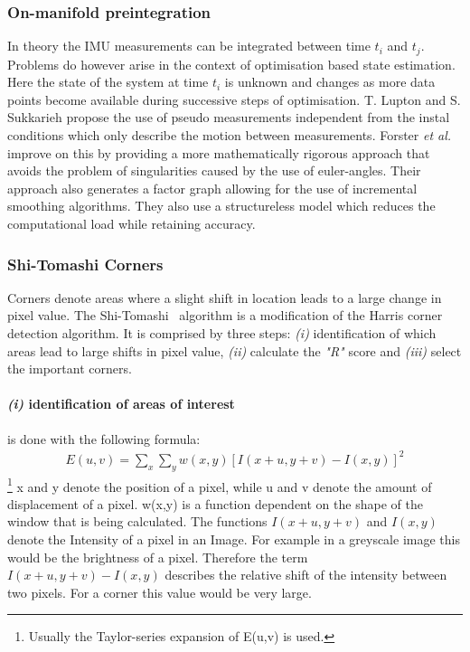 \documentclass[11pt,a4paper]{article}
\begin{document}
\subsubsection{On-manifold preintegration} \label{pre:on-manifold}
In theory the IMU measurements can be integrated between time $t_i$ and $t_j$.
Problems do however arise in the context of optimisation based state estimation. 
Here the state of the system at time $t_i$ is unknown and changes as more data points become available during successive steps of optimisation.
T. Lupton and S. Sukkarieh \cite{preint_lupton} propose the use of pseudo measurements independent from the instal conditions which only describe the motion between measurements.
Forster \textit{et al.} \cite{Forster_2017} improve on this by providing a more mathematically rigorous approach that avoids the problem of singularities caused by the use of euler-angles. 
Their approach also generates a factor graph allowing for the use of incremental smoothing algorithms. 
They also use a structureless model which reduces the computational load while retaining accuracy.

\subsubsection{Shi-Tomashi Corners} \label{Sec:Shi-Tomashi}
Corners denote areas where a slight shift in location leads to a large change in pixel value. 
The Shi-Tomashi~\cite{Shi_tomasi} algorithm is a modification of the Harris corner detection algorithm. 
It is comprised by three steps: \emph{(i)} identification of which areas lead to large shifts in pixel value, \emph{(ii)} calculate the \textit{"R"} score and \emph{(iii)} select the important corners.
\paragraph{\emph{(i)} identification of areas of interest} is done with the following formula:
\begin{align*}
    E(u,v) = \sum_{x} \sum_y w(x,y) [I(x+u,y+v)- I(x,y)]^2  
\end{align*}
\footnote{Usually the Taylor-series expansion of E(u,v) is used.}
x and y denote the position of a pixel, while u and v denote the amount of displacement of a pixel.
w(x,y) is a function dependent on the shape of the window that is being calculated. 
The functions $I(x+u,y+v)$ and $I(x,y)$ denote the Intensity of a pixel in an Image.
For example in a greyscale image this would be the brightness of a pixel.
Therefore the term $I(x+u,y+v)- I(x,y)$ describes the relative shift of the intensity between two pixels. For a corner this value would be very large.
\end{document}
